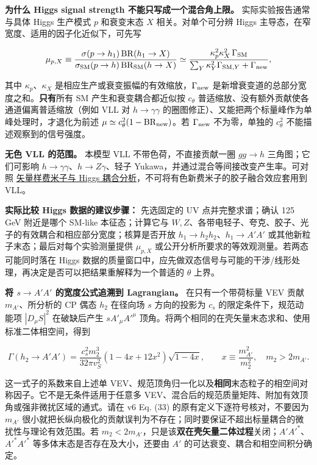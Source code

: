 \documentclass[
]{article}
\begin{document}
\textbf{为什么 Higgs signal strength 不能只写成一个混合角上限。}
实际实验报告通常与具体 Higgs 生产模式 \(p\) 和衰变末态 \(X\)
相关。对单个可分辨 Higgs 主导态，在窄宽度、适用的因子化近似下，可先写

\[
\mu_{p,X}\equiv\frac{\sigma(p\to h_1)\,{\rm BR}(h_1\to X)}
{\sigma_{\rm SM}(p\to h)\,{\rm BR}_{\rm SM}(h\to X)}
\simeq\frac{\kappa_p^2\kappa_X^2\,\Gamma_{\rm SM}}
{\sum_Y\kappa_Y^2\Gamma_{{\rm SM},Y}+\Gamma_{\rm new}},
\]

其中 \(\kappa_p\)、\(\kappa_X\)
是相应生产或衰变振幅的有效缩放，\(\Gamma_{\rm new}\)
是新增衰变道的总部分宽度之和。\textbf{只有}所有 SM
产生和衰变耦合都近似按 \(c_\theta\)
普适缩放、没有额外贡献使各通道偏离普适缩放（例如 VLL 对
\(h\to\gamma\gamma\)
的圈图修正）、又能把两个标量峰作为单峰处理时，才退化为前述
\(\mu\simeq c_\theta^2(1-\mathrm{BR}_{\rm new})\)。若
\(\Gamma_{\rm new}\) 不为零，单独的 \(c_\theta^2\)
不能描述观察到的信号强度。

\textbf{无色 VLL 的范围。} 本模型 VLL 不带色荷，不直接贡献一圈
\(gg\to h\) 三角图；它们可影响
\(h\to\gamma\gamma\)、\(h\to Z\gamma\)、轻子
Yukawa，并通过混合等间接改变产生率。可对照
\href{https://arxiv.org/abs/1207.7062}{矢量样费米子与 Higgs
耦合分析}，不可将有色新费米子的胶子融合效应套用到 VLL。

\textbf{实际比较 Higgs 数据的建议步骤：} 先选固定的 UV
点并完整求谱；确认 125 GeV 附近是哪个 SM-like 本征态；计算它与
\(W,Z\)、各带电轻子、夸克、胶子、光子的有效耦合和相应部分宽度；核算是否开放
\(h_1\to h_2h_2\)、\(h_1\to A'A'\)
或其他新粒子末态；最后对每个实验测量提供 \(\mu_{p,X}\)
或公开分析所要求的等效观测量。若两态可能同时落在 Higgs
数据的质量窗口中，应先做双态信号与可能的干涉/线形处理，再决定是否可以把结果重解释为一个普适的
\(\theta\) 上界。

\textbf{将 \(s\to A'A'\) 的宽度公式追溯到 Lagrangian。}
在只有一个带荷标量 VEV 贡献 \(m_{A'}\)、所分析的 CP 偶态 \(h_2\)
在径向场 \(s\) 方向的投影为 \(c_s\) 的限定条件下，规范动能项
\(|D_\mu S|^2\) 在破缺后产生 \(sA'_\mu A'^{\mu}\)
顶角。将两个相同的在壳矢量末态求和、使用标准二体相空间，得到

\[
\Gamma(h_2\to A'A')=
\frac{c_s^2m_2^3}{32\pi v_S^2}
(1-4x+12x^2)\sqrt{1-4x},\qquad
x\equiv\frac{m_{A'}^2}{m_2^2},\quad m_2>2m_{A'}.
\]

这一式子的系数来自上述单
VEV、规范顶角归一化以及\textbf{相同}末态粒子的相空间对称因子。它不是无条件适用于任意多
VEV、混合后的规范质量矩阵、附加有效顶角或强非微扰区域的通式。请在 v6 Eq.
(33) 的原有定义下逐符号核对，不要因为 \(m_{A'}\)
很小就把长纵向极化的贡献误判为不存在；同时要保证不超出标量耦合的微扰性与理论有效范围。若
\(m_2<2m_{A'}\)，只是该\textbf{双在壳矢量二体过程}关闭；\(A'A'^*\)、\(A'^*A'^*\)
等多体末态是否存在及大小，还要由 \(A'\)
的可达衰变、耦合和相空间积分确定。
\end{document}
